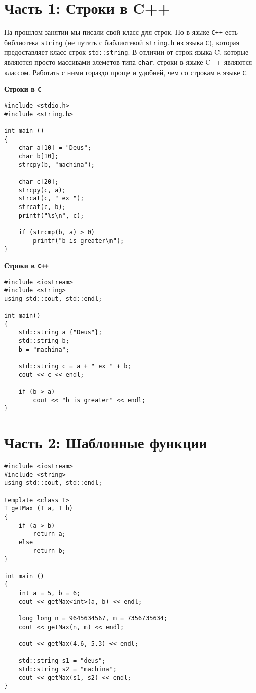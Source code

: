 \documentclass{article}
\begin{document}
\section*{Часть 1: Строки в C++}
На прошлом занятии мы писали свой класс для строк. Но в языке \texttt{C++} есть библиотека \texttt{string} (не путать с библиотекой \texttt{string.h} из языка \texttt{C}), которая предоставляет класс строк \texttt{std::string}. В отличии от строк языка C, которые являются просто массивами элеметов типа \texttt{char}, строки в языке C++ являются классом. Работать с ними гораздо проще и удобней, чем со строкам в языке \texttt{C}.
\begin{multicols}{2}
\textbf{Строки в \texttt{C}}
\begin{lstlisting}
#include <stdio.h>
#include <string.h> 

int main () 
{
    char a[10] = "Deus";
    char b[10];
    strcpy(b, "machina");
    
    char c[20];
    strcpy(c, a);
    strcat(c, " ex ");
    strcat(c, b);
    printf("%s\n", c);
    
    if (strcmp(b, a) > 0)
        printf("b is greater\n");
}
\end{lstlisting}
\vfill\null
\columnbreak
\textbf{Строки в \texttt{C++}}
\begin{lstlisting}
#include <iostream>
#include <string> 
using std::cout, std::endl;

int main() 
{
    std::string a {"Deus"};
    std::string b;
    b = "machina";
    
    std::string c = a + " ex " + b;
    cout << c << endl;
    
    if (b > a) 
        cout << "b is greater" << endl;
}
\end{lstlisting}
\end{multicols}


\newpage
\section*{Часть 2: Шаблонные функции}

\begin{lstlisting}
#include <iostream>
#include <string>
using std::cout, std::endl;

template <class T>
T getMax (T a, T b) 
{
    if (a > b)
    	return a;
    else 
    	return b;
}

int main () 
{
    int a = 5, b = 6;
    cout << getMax<int>(a, b) << endl;
    
    long long n = 9645634567, m = 7356735634;
    cout << getMax(n, m) << endl;
    
    cout << getMax(4.6, 5.3) << endl;
    
    std::string s1 = "deus"; 
    std::string s2 = "machina";
    cout << getMax(s1, s2) << endl;
}
\end{lstlisting}
\end{document}

